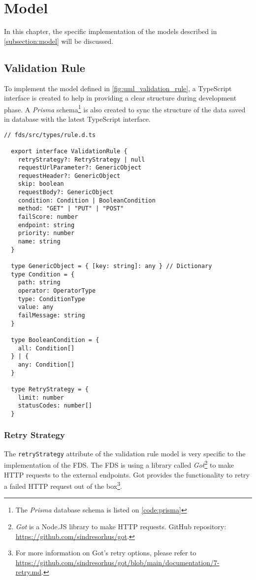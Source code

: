 \section{Model}

In this chapter, the specific implementation of the models described in \autoref{subsection:model} will be discussed. 

  \subsection{Validation Rule}
    To implement the model defined in \autoref{fig:uml_validation_rule}, a TypeScript interface is created to help in providing a clear structure during development phase. A \emph{Prisma} schema\footnote{The \emph{Prisma} database schema is listed on \autoref{code:prisma}} is also created to sync the structure of the data saved in database with the latest TypeScript interface. 

    \begin{lstlisting}[style=es6, caption={TypeScript interface of a validation rule (TypeScript)}]
  // fds/src/types/rule.d.ts
  
  export interface ValidationRule {
    retryStrategy?: RetryStrategy | null
    requestUrlParameter?: GenericObject
    requestHeader?: GenericObject
    skip: boolean
    requestBody?: GenericObject
    condition: Condition | BooleanCondition
    method: "GET" | "PUT" | "POST" 
    failScore: number
    endpoint: string
    priority: number
    name: string
  }
  
  type GenericObject = { [key: string]: any } // Dictionary
  type Condition = {
    path: string
    operator: OperatorType
    type: ConditionType
    value: any
    failMessage: string
  }

  type BooleanCondition = {
    all: Condition[]
  } | {
    any: Condition[]
  }

  type RetryStrategy = {
    limit: number
    statusCodes: number[] 
  }
    \end{lstlisting}
 
    \subsubsection{Retry Strategy}
      The \verb;retryStrategy; attribute of the validation rule model is very specific to the implementation of the FDS. The FDS is using a library called \emph{Got}\footnote{\emph{Got} is a Node.JS library to make HTTP requests. GitHub repository: \url{https://github.com/sindresorhus/got}.} to make HTTP requests to the external endpoints. Got provides the functionality to retry a failed HTTP request out of the box\footnote{For more information on Got's retry options, please refer to \url{https://github.com/sindresorhus/got/blob/main/documentation/7-retry.md}.}.

